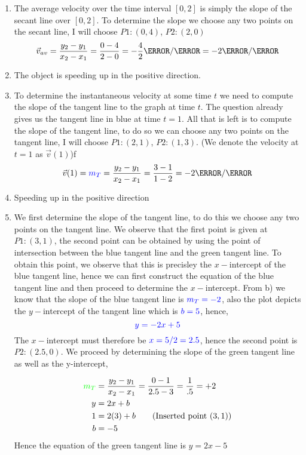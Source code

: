 \documentclass[12pt]{article} %
\begin{document}
\begin{qstn}[5]
    \begin{soln}

    \begin{enumerate}[label = (\alph*)]
        \item The average velocity over the time interval $[0,2]$ is simply the slope of the secant line over $[0,2]$. To determine the slope we choose any two points on the secant line, I will choose $P1 \colon (0,4)$, $P2 \colon (2,0)$
        $$\vec v_{av} = \frac{y_2 - y_1}{x_2 - x_1} = \frac{0 - 4}{2 - 0} = -\frac{4}{2} \m / \s = -2 \m / \s$$
        

        \item The object is speeding up in the positive direction.
        \item To determine the instantaneous velocity at some time $t$ we need to compute the slope of the tangent line to the graph at time $t$. The question already gives us the tangent line in blue at time $t = 1$. All that is left is to compute the slope of the tangent line, to do so we can choose any two points on the tangent line, I will choose $P1 \colon (2,1)$, $P2 \colon (1,3)$. (We denote the velocity at $t = 1$ as $\vec v(1)$)f
        $$\vec v(1) = \textcolor{blue}{m_T} = \frac{y_2 - y_1}{x_2 - x_1}= \frac{3 - 1}{1 - 2} = -2 \m / \s$$
        \item Speeding up in the positive direction
        \item We first determine the slope of the tangent line, to do this we choose any two points on the tangent line. We observe that the first point is given at $P1 \colon (3,1)$, the second point can be obtained by using the point of intersection between the blue tangent line and the green tangent line. To obtain this point, we observe that this is precisley the $x-$intercept of the blue tangent line, hence we can first construct the equation of the blue tangent line and then proceed to determine the $x-$intercept. From b) we know that the slope of the blue tangent line is $\textcolor{blue}{m_T = -2}$, also the plot depicts the $y-$intercept of the tangent line which is $\textcolor{blue}{b = 5}$, hence,
        $$\textcolor{blue}{y = -2x + 5}$$
        The $x-$intercept must therefore be $\textcolor{blue}{x = 5 /2 = 2.5}$, hence the second point is $P2 \colon (2.5,0)$. We proceed by determining the slope of the green tangent line as well as the y-intercept,

        \begin{align*}
        \textcolor{green}{m_T} &= \frac{y_2 - y_1}{x_2 - x_1} = \frac{0 - 1}{2.5 - 3} = \frac{1}{.5} = +2\\
        y &= 2x + b\\
        1 &= 2(3) + b \tag{Inserted point $(3,1)$}\\
        b &= -5\\
        \end{align*}
        Hence the equation of the green tangent line is $y = 2x - 5$





\end{enumerate}
\end{soln}
\end{qstn}
\end{document}
